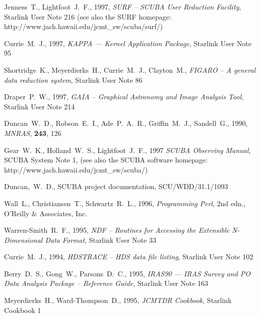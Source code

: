 \documentclass[twoside,11pt]{article}
\newcommand{\htmladdnormallink}[2]{#1}
\newcommand{\xref}[3]{#1}
\begin{document}
{\clearpage

\begin{thebibliography}{}

Jenness~T., Lightfoot~J.~F., 1997, \textit{SURF -- SCUBA User Reduction Facility},
\xref{Starlink User Note 216}{sun216}{} (see also the SURF homepage:
\htmladdnormallink{http://www.jach.hawaii.edu/jcmt\_sw/scuba/surf/}{http://www.jach.hawaii.edu/jcmt_sw/scuba/surf/})

Currie~M.~J., 1997, {\it KAPPA --- Kernel Application Package},
\xref{Starlink User Note 95}{sun95}{}

Shortridge~K., Meyerdierks~H., Currie~M.~J., Clayton~M., 
{\it FIGARO -- A general data reduction system}, 
\xref{Starlink User Note 86}{sun86}{}

Draper~P.~W., 1997, {\it GAIA -- Graphical Astronomy and Image Analysis Tool},
\xref{Starlink User Note 214}{sun214}{}

Duncan~W.~D., Robson~E.~I., Ade~P.~A.~R., Griffin~M.~J., Sandell~G., 1990,
\textit{MNRAS}, \textbf{243}, 126

Gear~W.~K., Holland~W.~S., Lightfoot~J.~F., 1997 
\textit{SCUBA Observing Manual}, \htmladdnormallink{SCUBA System Note
1}{http://www.jach.hawaii.edu/jcmt_sw/scuba/}, (see also the SCUBA software homepage:
\htmladdnormallink{http://www.jach.hawaii.edu/jcmt\_sw/scuba/}{http://www.jach.hawaii.edu/jcmt_sw/scuba/})

Duncan,~W.~D., SCUBA project documentation, SCU/WDD/31.1/1093

Wall~L., Christiansen~T., Schwartz~R.~L., 1996, 
\htmladdnormallink{\textit{Programming Perl}}{http://www.perl.org/}, 2nd
edn., \htmladdnormallink{O'Reilly \& Associates, Inc.}{http://www.ora.com/}


Warren-Smith~R.~F., 1995, {\it NDF -- Routines for Accessing the Extensible
N-Dimensional Data Format}, \xref{Starlink User Note 33}{sun33}{}

Currie~M.~J., 1994, {\it HDSTRACE -- HDS data file listing}, 
\xref{Starlink User Note 102}{sun102}{}

Berry~D.~S., Gong~W., Parsons~D.~C., 1995, {\it IRAS90 --- IRAS Survey and PO
Data Analysis Package -- Reference Guide}, \xref{Starlink User Note
163}{sun163}{} 

Meyerdierks~H., Ward-Thompson~D., 1995, \textit{JCMTDR Cookbook},
\xref{Starlink Cookbook 1}{sc1}{}


\end{thebibliography}}
\end{document}
